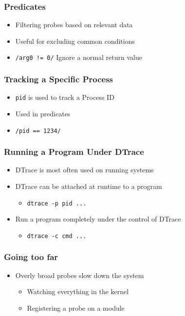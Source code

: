 \documentclass[pdftex]{beamer}
\begin{document}
\begin{frame}[fragile]
  \frametitle{Predicates}
  \begin{itemize}
  \item Filtering probes based on relevant data
  \item Useful for excluding common conditions
  \item \verb+/arg0 != 0/+  Ignore a normal return value
  \end{itemize}
\end{frame}

\begin{frame}[fragile]
  \frametitle{Tracking a Specific Process}
  \begin{itemize}
  \item \verb+pid+ is used to track a Process ID
  \item Used in predicates
  \item \verb+/pid == 1234/+
\end{itemize}
\end{frame}

\begin{frame}[fragile]
  \frametitle{Running a Program Under DTrace}
  \begin{itemize}
  \item DTrace is most often used on running systems
  \item DTrace can be attached at runtime to a program
    \begin{itemize}
    \item \verb+dtrace -p pid ...+
    \end{itemize}
  \item Run a program completely under the control of DTrace
    \begin{itemize}
    \item \verb+dtrace -c cmd ...+
    \end{itemize}
  \end{itemize}
\end{frame}

\begin{frame}
  \frametitle{Going too far}
  \begin{itemize}
  \item Overly broad probes slow down the system
    \begin{itemize}
    \item Watching everything in the kernel
    \item Registering a probe on a module
    \end{itemize}
  \end{itemize}
\end{frame}
\end{document}
